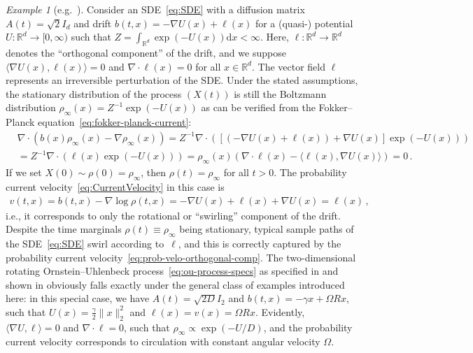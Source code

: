 \documentclass[oneside,11pt]{article}
\theoremstyle{remark}
\newtheorem{example}{Example}
\begin{document}
\begin{example}[e.g.~\cite{rey-bellet-spiliopoulos:2015}]
    \label{example:ortho-comp}
    Consider an SDE~\eqref{eq:SDE} with a diffusion matrix $A(t) = \sqrt{2} I_d$ and drift $b(t,x) = - \nabla U(x) + \ell(x)$ for a (quasi-) potential $U \colon \mathbb{R}^d \to [0,\infty)$ such that $Z = \int_{\mathbb{R}^d} \exp(-U(x)) \mathrm{d}x < \infty$. Here, $\ell \colon \mathbb{R}^d \to \mathbb{R}^d$ denotes the  ``orthogonal component'' of the drift, and we suppose $\langle \nabla U(x), \ell(x) \rangle = 0$ and $\nabla \cdot \ell(x) = 0$ for all $x \in \mathbb{R}^d$. The vector field $\ell$ represents an irreversible perturbation of the SDE. Under the stated assumptions, the stationary distribution of the process $(X(t))$ is still the Boltzmann distribution $\rho_\infty(x) = Z^{-1} \exp (-U(x))$ as can be verified from the Fokker--Planck equation~\eqref{eq:fokker-planck-current}:
    \begin{align*}
        &\nabla \cdot \left(b(x) \rho_\infty(x) - \nabla \rho_\infty(x) \right) = Z^{-1} \nabla \cdot \left( \left[(-\nabla U(x) + \ell(x)) + \nabla U(x) \right] \exp (-U(x)) \right)\\
        &= Z^{-1} \nabla \cdot \left( \ell(x)  \exp (-U(x)) \right) = \rho_\infty(x) \left(\nabla \cdot \ell(x) - \langle \ell(x), \nabla U(x) \rangle \right) = 0\,.
    \end{align*}
    If we set $X(0) \sim \rho(0) = \rho_\infty$, then $\rho(t) = \rho_\infty$ for all $t > 0$. The probability current velocity~\eqref{eq:CurrentVelocity} in this case is
    \begin{align}
        v(t,x) = b(t,x) - \nabla \log \rho(t,x) = -\nabla U(x) + \ell(x) + \nabla U(x) = \ell(x)\,,
        \label{eq:prob-velo-orthogonal-comp}
    \end{align}
    i.e., it corresponds to only the rotational or ``swirling'' component of the drift. Despite the time marginals $\rho(t) \equiv \rho_\infty$ being stationary, typical sample paths of the SDE~\eqref{eq:SDE} swirl according to~$\ell$, and this is correctly captured by the probability current velocity~\eqref{eq:prob-velo-orthogonal-comp}. The two-dimensional rotating Ornstein--Uhlenbeck process~\eqref{eq:ou-process-specs} as specified in  and shown in  obviously falls exactly under the general class of examples introduced here: in this special case, we have $A(t) = \sqrt{2 D}I_2$ and $b(t,x) = - \gamma x + \Omega R x$, such that $U(x) = \tfrac{\gamma}{2} \lVert x \rVert_2^2$ and $\ell(x) = v(x) = \Omega R x$. Evidently, $\langle \nabla U, \ell \rangle = 0$ and $\nabla \cdot \ell = 0$, such that $\rho_\infty \propto \exp(-U / D)$, and the probability current velocity corresponds to circulation with constant angular velocity $\Omega$.
\end{example}
\end{document}
